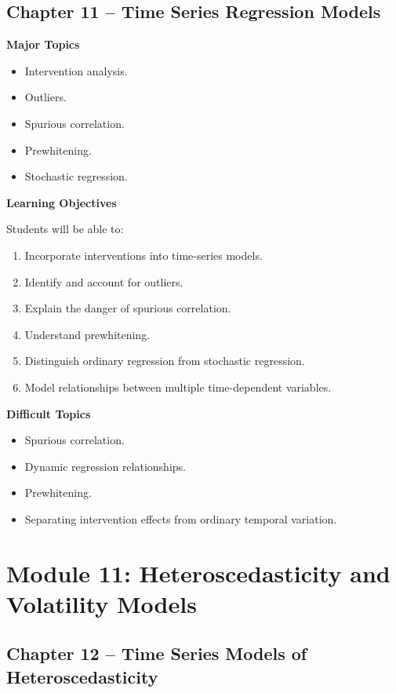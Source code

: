\documentclass[11pt,a4paper]{article}
\begin{document}
\subsection{Chapter 11 -- Time Series Regression Models}

\textbf{Major Topics}

\begin{itemize}
    \item Intervention analysis.
    \item Outliers.
    \item Spurious correlation.
    \item Prewhitening.
    \item Stochastic regression.
\end{itemize}

\textbf{Learning Objectives}

Students will be able to:

\begin{enumerate}
    \item Incorporate interventions into time-series models.
    \item Identify and account for outliers.
    \item Explain the danger of spurious correlation.
    \item Understand prewhitening.
    \item Distinguish ordinary regression from stochastic regression.
    \item Model relationships between multiple time-dependent variables.
\end{enumerate}

\textbf{Difficult Topics}

\begin{itemize}
    \item Spurious correlation.
    \item Dynamic regression relationships.
    \item Prewhitening.
    \item Separating intervention effects from ordinary temporal variation.
\end{itemize}

\section{Module 11: Heteroscedasticity and Volatility Models}

\subsection{Chapter 12 -- Time Series Models of Heteroscedasticity}
\end{document}
